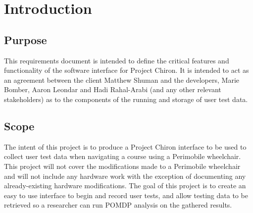 \documentclass[onecolumn, draftclsnofoot,10pt, compsoc]{IEEEtran}
\begin{document}
\section{Introduction}
\subsection{Purpose}
This requirements document is intended to define the critical features and functionality of the software interface for Project Chiron. It is intended to act as an agreement between the client Matthew Shuman and the developers, Marie Bomber, Aaron Leondar and Hadi Rahal-Arabi (and any other relevant stakeholders) as to the components of the running and storage of user test data.
\subsection{Scope}
The intent of this project is to produce a Project Chiron interface to be used to collect user test data when navigating a course using a Perimobile wheelchair. This project will not cover the modifications made to a Perimobile wheelchair and will not include any hardware work with the exception of documenting any already-existing hardware modifications. The goal of this project is to create an easy to use interface to begin and record user tests, and allow testing data to be retrieved so a researcher can run POMDP analysis on the gathered results.
\end{document}
